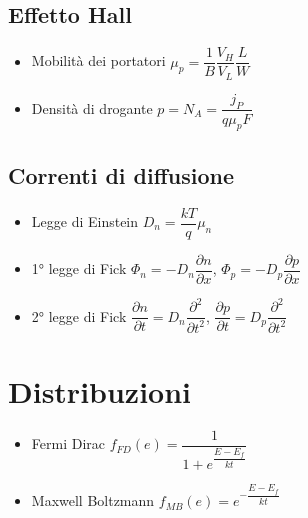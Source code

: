 \documentclass{article}
\begin{document}
\subsection{Effetto Hall}
\begin{itemize}
  \item Mobilità dei portatori \( \mu_p = \dfrac{1}{B} \dfrac{V_H}{V_L} \dfrac{L}{W} \)
  \item Densità di drogante \( p = N_A = \dfrac{j_P}{q \mu_p F} \)
\end{itemize}


\subsection{Correnti di diffusione}
\begin{itemize}
  \item Legge di Einstein \( D_n = \dfrac{k T}{q} \mu_n \)
  \item 1° legge di Fick \( \Phi_n = - D_n \dfrac{\partial n}{\partial x} \), \( \Phi_p = - D_p \dfrac{\partial p}{\partial x} \)
  \item 2° legge di Fick \( \dfrac{\partial n}{\partial t} = D_n \dfrac{\partial ^ 2}{\partial t ^ 2}\), \( \dfrac{\partial p}{\partial t} = D_p \dfrac{\partial ^ 2}{\partial t ^ 2}\)
\end{itemize}

\section{Distribuzioni}
\begin{itemize}
  \item Fermi Dirac \( f_{FD} (e) = \dfrac{1}{1 + e ^{\dfrac{E - E_f}{kt}}} \)
  \item Maxwell Boltzmann \( f_{MB} (e) = e ^ {-\dfrac{E - E_f}{kt}} \)
\end{itemize}
\end{document}
